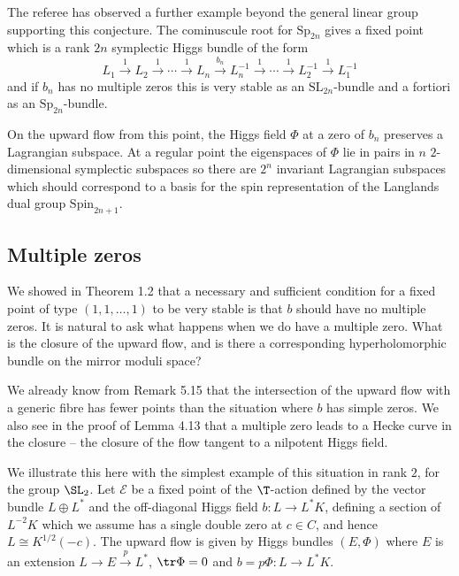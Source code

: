 	\begin{remark}
\notready
The referee has observed a further example beyond the general linear group supporting this conjecture. The cominuscule root for $\mathrm{Sp}_{2n}$ gives a fixed point which is a rank $2n$ symplectic Higgs bundle of the form
$$L_1\stackrel{1}\rightarrow L_2\stackrel{1}\rightarrow\cdots \stackrel{1}\rightarrow L_n\stackrel{b_n}\rightarrow L_n^{-1}\stackrel{1}\rightarrow \cdots \stackrel{1}\rightarrow L_2^{-1}\stackrel{1}\rightarrow L_1^{-1}$$
	and if $b_n$ has no multiple zeros this is very stable as an $\mathrm {SL}_{2n}$-bundle and a fortiori as an $\mathrm{Sp}_{2n}$-bundle.

	On the upward flow from this point, the Higgs field $\Phi$
	at a zero of $b_n$  preserves a Lagrangian subspace. At a regular point the eigenspaces of $\Phi$ lie in pairs  in $n$ $2$-dimensional symplectic subspaces so there are $2^n$ invariant Lagrangian subspaces which should correspond  to a basis for the spin representation of the Langlands dual group $\mathrm{Spin}_{2n+1}.$

\end{remark}


\subsection{Multiple zeros} \label{multiple}

We showed in Theorem 1.2 that a necessary and sufficient condition for a fixed point of type $(1,1,\dots,1)$ to be very stable is that $b$
should have no multiple zeros. It is natural to ask what happens when we do have a multiple zero. What is the closure of the upward flow,
and is there a corresponding hyperholomorphic bundle on the mirror moduli space?

We already know from Remark 5.15 that the intersection
of the upward flow with a generic fibre has fewer points than the situation where $b$ has simple zeros. We also see in the proof of Lemma 4.13
that a multiple zero leads to a Hecke curve in the closure -- the closure of the flow tangent to a nilpotent Higgs field.

We illustrate this  here with the simplest
example of this situation in rank $2$, for the group $\SL_2$. Let ${\mathcal E}$ be a fixed point of the $\T$-action defined by the vector bundle
$L\oplus L^*$ and the off-diagonal Higgs
field $b: L\rightarrow L^*K$, defining  a section of $L^{-2}K$ which we assume has  a single double zero at $c\in C$, and hence $L\cong K^{1/2}(-c)$.
The upward
flow is given
by Higgs bundles $(E,\Phi)$ where $E$ is an extension $L\rightarrow E\stackrel p\rightarrow L^*$, $\tr \Phi=0$ and $b=p \Phi:L\rightarrow L^*K$.

